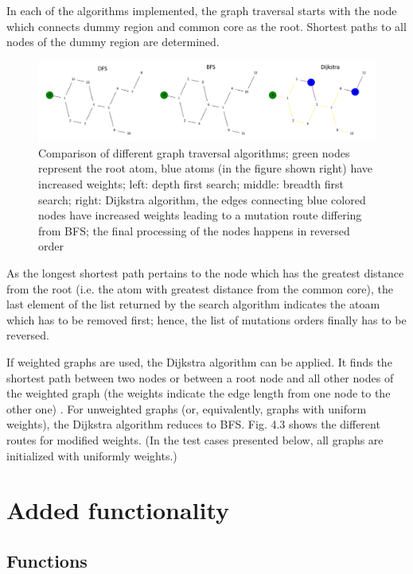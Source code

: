 In each of the algorithms implemented, the graph traversal starts
with the node which connects dummy region and common core as the root.
Shortest paths to all nodes of the dummy region are determined.

\begin{figure}

\includegraphics[scale=0.45]{dfs_bfs_dijkstra_comp1}\caption{Comparison of different graph traversal algorithms; green nodes represent the root atom, blue atoms (in the figure shown right) have increased weights; left: depth first
search; middle: breadth first search; right: Dijkstra algorithm, the
edges connecting blue colored nodes have increased weights leading
to a mutation route differing from BFS; the final processing of the
nodes happens in reversed order}

\end{figure}

As the longest shortest path pertains to the node which has the greatest
distance from the root (i.e. the atom with greatest distance from
the common core), the last element of the list returned by the search algorithm indicates the atoam which has to be removed first; hence, the list of mutations orders finally has to be reversed.

If weighted graphs are used, the Dijkstra algorithm can be applied.
It finds the shortest path between two nodes or between a root node
and all other nodes of the weighted graph (the weights indicate the
edge length from one node to the other one) . For unweighted graphs
(or, equivalently, graphs with uniform weights), the Dijkstra algorithm
reduces to BFS. Fig. 4.3 shows the different routes for modified weights.
(In the test cases presented below, all graphs are initialized with uniformly weights.)

\section{Added functionality}

\subsection{Functions}

